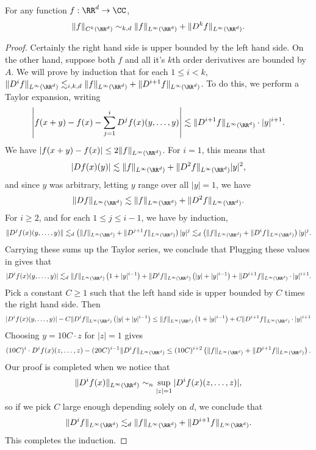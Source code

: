 \begin{theorem}
    For any function $f: \RR^d \to \CC$,
    \[ \| f \|_{C^k(\RR^d)} \sim_{k,d} \| f \|_{L^\infty(\RR^d)} + \| D^k f \|_{L^\infty(\RR^d)}. \]
\end{theorem}
\begin{proof}
    Certainly the right hand side is upper bounded by the left hand side. On the other hand, suppose both $f$ and all it's $k$th order derivatives are bounded by $A$. We will prove by induction that for each $1 \leq i < k$, $\| D^i f \|_{L^\infty(\RR^d)} \lesssim_{i,k,d} \| f \|_{L^\infty(\RR^d)} + \| D^{i+1} f \|_{L^\infty(\RR^d)}$. To do this, we perform a Taylor expansion, writing
    \[ \left| f(x+y) - f(x) - \sum_{j = 1}^i D^j f(x) (y,\dots,y) \right| \lesssim \| D^{i+1} f \|_{L^\infty(\RR^d)} \cdot |y|^{i+1}. \]
    We have $|f(x+y) - f(x)| \leq 2 \| f \|_{L^\infty(\RR^d)}$. For $i = 1$, this means that
    \[ |Df(x)(y)| \lesssim \| f \|_{L^\infty(\RR^d)} + \| D^2 f \|_{L^\infty(\RR^d)} |y|^2, \]
    and since $y$ was arbitrary, letting $y$ range over all $|y| = 1$, we have
    \[ \| Df \|_{L^\infty(\RR^d)} \lesssim \| f \|_{L^\infty(\RR^d)} + \| D^2 f \|_{L^\infty(\RR^d)}. \]
    For $i \geq 2$, and for each $1 \leq j \leq i-1$, we have by induction,
    \[ \| D^j f(x) (y,\dots,y) \| \lesssim_d \left( \| f \|_{L^\infty(\RR^d)} + \| D^{j+1} f \|_{L^\infty(\RR^d)} \right) |y|^j \lesssim_d \left( \| f \|_{L^\infty(\RR^d)} + \| D^i f \|_{L^\infty(\RR^d)} \right) |y|^j. \]
    Carrying these sums up the Taylor series, we conclude that
    Plugging these values in gives that
    \[ |D^i f(x)(y,\dots,y)| \lesssim_d \| f \|_{L^\infty(\RR^d)} \left( 1 + |y|^{i-1} \right) + \| D^i f \|_{L^\infty(\RR^d)} \left( |y| + |y|^{i-1} \right) + \| D^{i+1} f \|_{L^\infty(\RR^d)} \cdot |y|^{i+1}. \]
    Pick a constant $C \geq 1$ such that the left hand side is upper bounded by $C$ times the right hand side. Then
    \[ |D^i f(x)(y,\dots,y)| - C \| D^i f \|_{L^\infty(\RR^d)} \left( |y| + |y|^{i-1} \right) \leq \| f \|_{L^\infty(\RR^d)} \left( 1 + |y|^{i-1} \right) + C \| D^{i+1} f \|_{L^\infty(\RR^d)} \cdot |y|^{i+1} \]
    Choosing $y = 10C \cdot z$ for $|z| = 1$ gives
    \[ (10C)^i \cdot D^i f(x)(z,\dots,z) - (20C)^{i-1} \| D^i f \|_{L^\infty(\RR^d)} \leq (10 C)^{i+2} \left( \| f \|_{L^\infty(\RR^d)} + \| D^{i+1} f \|_{L^\infty(\RR^d)} \right). \]
    Our proof is completed when we notice that
    \[ \| D^i f(x) \|_{L^\infty(\RR^d)} \sim_n \sup_{|z| = 1} |D^i f(x)(z,\dots,z)|, \]
    so if we pick $C$ large enough depending solely on $d$, we conclude that
    \[ \| D^i f \|_{L^\infty(\RR^d)} \lesssim_d \| f \|_{L^\infty(\RR^d)} + \| D^{i+1} f \|_{L^\infty(\RR^d)}. \]
    This completes the induction.
\end{proof}

